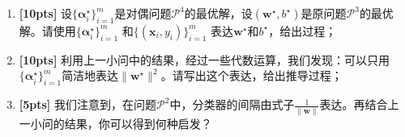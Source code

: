 \documentclass[a4paper,UTF8]{article}
\theoremstyle{definition}
\begin{document}
\begin{enumerate}[(1)]
	\item \textbf{[10pts]} 设$\{\bm{\alpha}^\star_i\}_{i=1}^{m}$是对偶问题$\mathcal{P}^{4}$的最优解，设$(\mathbf{w}^\star,b^\star)$是原问题$\mathcal{P}^{3}$的最优解。请使用$\{\bm{\alpha}^\star_i\}_{i=1}^{m}$ 和$\{(\mathbf{x}_i,y_i)\}_{i=1}^{m}$ 表达$\mathbf{w}^\star$和$b^\star$，给出过程；
	\item \textbf{[10pts]} 利用上一小问中的结果，经过一些代数运算，我们发现：可以只用$\{\bm{\alpha}^\star_i\}_{i=1}^{m}$简洁地表达$\|\mathbf{w}^\star\|^2$。请写出这个表达，给出推导过程；
	\item \textbf{[5pts]} 我们注意到，在问题$\mathcal{P}^{2}$中，分类器的间隔由式子$\frac{1}{\|\mathbf{w}\|}$表达。再结合上一小问的结果，你可以得到何种启发？

\end{enumerate}
\end{document}
